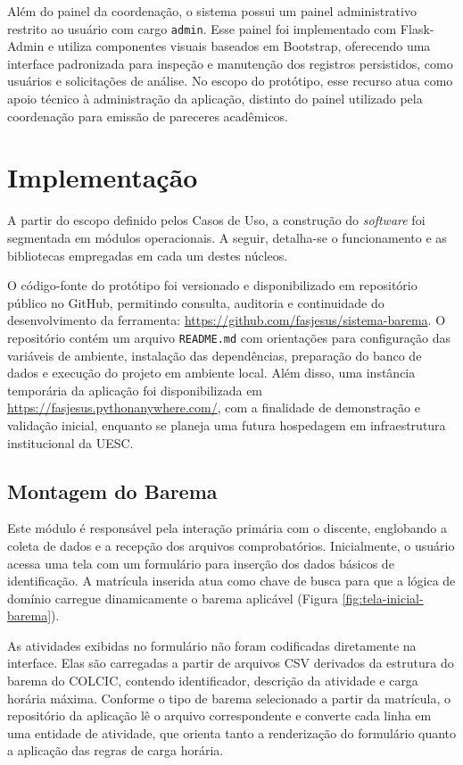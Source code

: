 Além do painel da coordenação, o sistema possui um painel administrativo restrito ao usuário com cargo \texttt{admin}. Esse painel foi implementado com Flask-Admin e utiliza componentes visuais baseados em Bootstrap, oferecendo uma interface padronizada para inspeção e manutenção dos registros persistidos, como usuários e solicitações de análise. No escopo do protótipo, esse recurso atua como apoio técnico à administração da aplicação, distinto do painel utilizado pela coordenação para emissão de pareceres acadêmicos.

\section{Implementação}

A partir do escopo definido pelos Casos de Uso, a construção do \textit{software} foi segmentada em módulos operacionais. A seguir, detalha-se o funcionamento e as bibliotecas empregadas em cada um destes núcleos.

O código-fonte do protótipo foi versionado e disponibilizado em repositório público no GitHub, permitindo consulta, auditoria e continuidade do desenvolvimento da ferramenta: \url{https://github.com/fasjesus/sistema-barema}. O repositório contém um arquivo \texttt{README.md} com orientações para configuração das variáveis de ambiente, instalação das dependências, preparação do banco de dados e execução do projeto em ambiente local. Além disso, uma instância temporária da aplicação foi disponibilizada em \url{https://fasjesus.pythonanywhere.com/}, com a finalidade de demonstração e validação inicial, enquanto se planeja uma futura hospedagem em infraestrutura institucional da UESC.

\subsection{Montagem do Barema}

Este módulo é responsável pela interação primária com o discente, englobando a coleta de dados e a recepção dos arquivos comprobatórios. Inicialmente, o usuário acessa uma tela com um formulário para inserção dos dados básicos de identificação. A matrícula inserida atua como chave de busca para que a lógica de domínio carregue dinamicamente o barema aplicável (Figura \ref{fig:tela-inicial-barema}).

As atividades exibidas no formulário não foram codificadas diretamente na interface. Elas são carregadas a partir de arquivos CSV derivados da estrutura do barema do COLCIC, contendo identificador, descrição da atividade e carga horária máxima. Conforme o tipo de barema selecionado a partir da matrícula, o repositório da aplicação lê o arquivo correspondente e converte cada linha em uma entidade de atividade, que orienta tanto a renderização do formulário quanto a aplicação das regras de carga horária.

